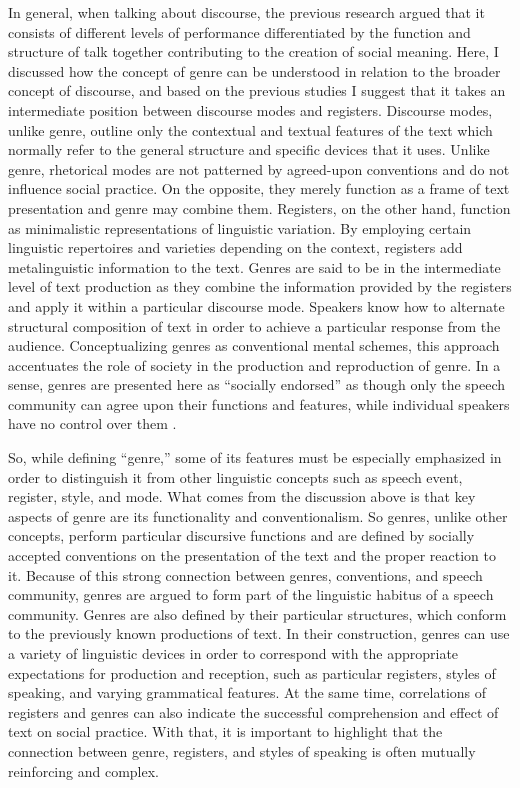 \documentclass[12pt]{article}
\begin{document}
In general, when talking about discourse, the previous research argued that it consists of different levels of performance differentiated by the function and structure of talk together contributing to the creation of social meaning. Here, I discussed how the concept of genre can be understood in relation to the broader concept of discourse, and based on the previous studies I suggest that it takes an intermediate position between discourse modes and registers. Discourse modes, unlike genre, outline only the contextual and textual features of the text which normally refer to the general structure and specific devices that it uses. Unlike genre, rhetorical modes are not patterned by agreed-upon conventions and do not influence social practice. On the opposite, they merely function as a frame of text presentation and genre may combine them. Registers, on the other hand, function as minimalistic representations of linguistic variation. By employing certain linguistic repertoires and varieties depending on the context, registers add metalinguistic information to the text. Genres are said to be in the intermediate level of text production as they combine the information provided by the registers and apply it within a particular discourse mode. Speakers know how to alternate structural composition of text in order to achieve a particular response from the audience. Conceptualizing genres as conventional mental schemes, this approach accentuates the role of society in the production and reproduction of genre. In a sense, genres are presented here as ``socially endorsed'' as though only the speech community can agree upon their functions and features, while individual speakers have no control over them \parencite[p. 60]{bax2011}.  

So, while defining ``genre,'' some of its features must be especially emphasized in order to distinguish it from other linguistic concepts such as speech event, register, style, and mode. What comes from the discussion above is that key aspects of genre are its functionality and conventionalism. So genres, unlike other concepts, perform particular discursive functions and are defined by socially accepted conventions on the presentation of the text and the proper reaction to it. Because of this strong connection between genres, conventions, and speech community, genres are argued to form part of the linguistic habitus of a speech community. Genres are also defined by their particular structures, which conform to the previously known productions of text. In their construction, genres can use a variety of linguistic devices in order to correspond with the appropriate expectations for production and reception, such as particular registers, styles of speaking, and varying grammatical features. At the same time, correlations of registers and genres can also indicate the successful comprehension and effect of text on  social practice. With that, it is important to highlight that the connection between genre, registers, and styles of speaking is often mutually reinforcing and complex. 
\end{document}
